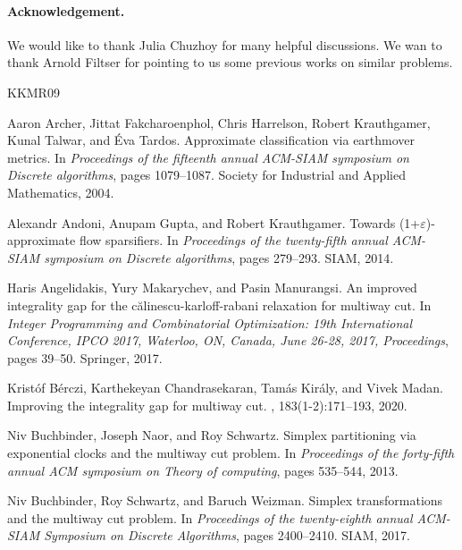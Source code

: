\documentclass[11pt]{article}
\theoremstyle{definition}
\begin{document}
\paragraph{Acknowledgement.} We would like to thank Julia Chuzhoy for many helpful discussions. We wan to thank Arnold Filtser for pointing to us some previous works on similar problems.


\newcommand{\etalchar}[1]{$^{#1}$}
\begin{thebibliography}{KKMR09}

\bibitem[AFH{\etalchar{+}}04]{archer2004approximate}
Aaron Archer, Jittat Fakcharoenphol, Chris Harrelson, Robert Krauthgamer, Kunal
  Talwar, and {\'E}va Tardos.
\newblock Approximate classification via earthmover metrics.
\newblock In {\em Proceedings of the fifteenth annual ACM-SIAM symposium on
  Discrete algorithms}, pages 1079--1087. Society for Industrial and Applied
  Mathematics, 2004.

Alexandr Andoni, Anupam Gupta, and Robert Krauthgamer.
\newblock Towards (1+{$\varepsilon$})-approximate flow sparsifiers.
\newblock In {\em Proceedings of the twenty-fifth annual ACM-SIAM symposium on
  Discrete algorithms}, pages 279--293. SIAM, 2014.

Haris Angelidakis, Yury Makarychev, and Pasin Manurangsi.
\newblock An improved integrality gap for the c{\u{a}}linescu-karloff-rabani
  relaxation for multiway cut.
\newblock In {\em Integer Programming and Combinatorial Optimization: 19th
  International Conference, IPCO 2017, Waterloo, ON, Canada, June 26-28, 2017,
  Proceedings}, pages 39--50. Springer, 2017.

Krist{\'o}f B{\'e}rczi, Karthekeyan Chandrasekaran, Tam{\'a}s Kir{\'a}ly, and
  Vivek Madan.
\newblock Improving the integrality gap for multiway cut.
, 183(1-2):171--193, 2020.

Niv Buchbinder, Joseph Naor, and Roy Schwartz.
\newblock Simplex partitioning via exponential clocks and the multiway cut
  problem.
\newblock In {\em Proceedings of the forty-fifth annual ACM symposium on Theory
  of computing}, pages 535--544, 2013.

Niv Buchbinder, Roy Schwartz, and Baruch Weizman.
\newblock Simplex transformations and the multiway cut problem.
\newblock In {\em Proceedings of the twenty-eighth annual ACM-SIAM Symposium on
  Discrete Algorithms}, pages 2400--2410. SIAM, 2017.


\end{thebibliography}
\end{document}
